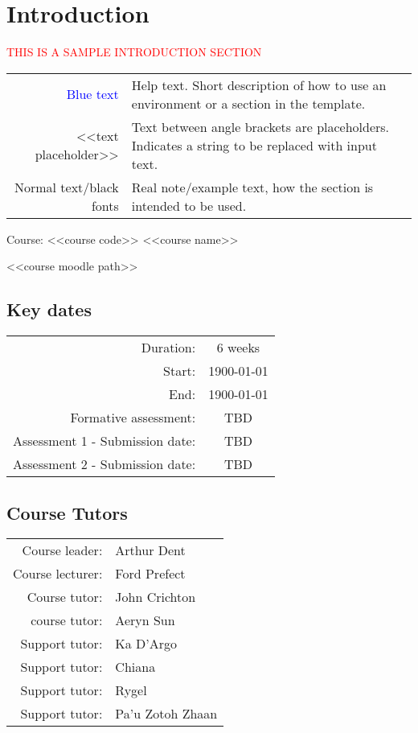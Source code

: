 \section{Introduction}

{\begin{center}
    \textcolor{red}{\Huge{THIS IS A SAMPLE INTRODUCTION SECTION}}

    \begin{tabular}{r @{: } p{80mm}}
        {\textcolor{blue}{Blue text}} &  Help text. Short description of how to use an environment or a section in the template.\\
        <<text placeholder>> & Text between angle brackets are placeholders. Indicates a string to be replaced with input text.\\
        Normal text/black fonts & Real note/example text, how the section is intended to be used.
    \end{tabular}

\end{center}


{\huge{Course: <<course code>> <<course name>>}}

<<course moodle path>>

\subsection{Key dates}

\begin{tabular}{r @{} c}
    Duration: & 6 weeks\\
    Start: & 1900-01-01\\
    End: & 1900-01-01\\
    Formative assessment: & TBD\\
    Assessment 1 - Submission date: & TBD\\
    Assessment 2 - Submission date: & TBD\\
\end{tabular}

\subsection{Course Tutors}

\begin{tabular}{r @{} l}
    Course leader: & Arthur Dent\\
    Course lecturer: & Ford Prefect\\
    Course tutor: & John Crichton\\
    course tutor: & Aeryn Sun\\
    Support tutor: & Ka D'Argo\\
    Support tutor: & Chiana\\
    Support tutor: & Rygel\\
    Support tutor: & Pa'u Zotoh Zhaan\\
\end{tabular}

}
